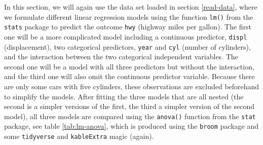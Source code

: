 \documentclass[
  11pt,
  a4paper,
  twoside]{scrbook}
\begin{document}
In this section, we will again use the data set loaded in section \ref{read-data}, where we formulate different linear regression models using the function \texttt{lm()} from the \texttt{stats} package to predict the outcome \texttt{hwy} (highway miles per gallon). The first one will be a more complicated model including a continuous predictor, \texttt{displ} (displacement), two categorical predictors, \texttt{year} and \texttt{cyl} (number of cylinders), and the interaction between the two categorical independent variables. The second one will be a model with all three predictors but without the interaction, and the third one will also omit the continuous predictor variable. Because there are only some cars with five cylinders, these observations are excluded beforehand to simplify the models. After fitting the three models that are all nested (the second is a simpler versions of the first, the third a simpler version of the second model), all three models are compared using the \texttt{anova()} function from the \texttt{stat} package, see table \ref{tab:lm-anova}, which is produced using the \texttt{broom} package and some \texttt{tidyverse} and \texttt{kableExtra} magic (again).

\linespread{1}
\end{document}
